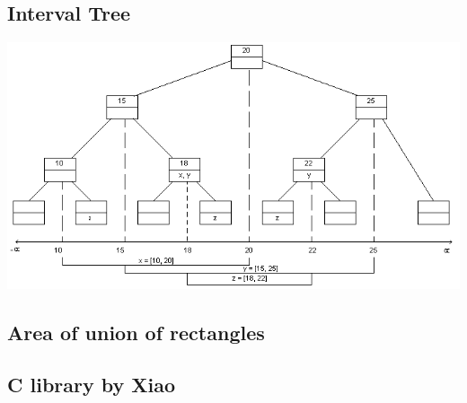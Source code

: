 \subsection{Interval Tree}

\includegraphics[scale=0.38]{Geometrie/it.png}



\subsection{Area of union of rectangles}



\subsection{C library by Xiao}

\lstset{language=C}

\lstset{language=Java}

